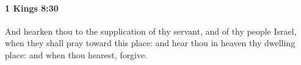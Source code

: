 
		\paragraph{1 Kings 8:30} %
			\label{1KINGS-8-30}

			And hearken thou to the supplication of thy servant, and of thy people Israel, when they shall pray toward this place: and hear thou in heaven thy dwelling place: and when thou hearest, forgive.


